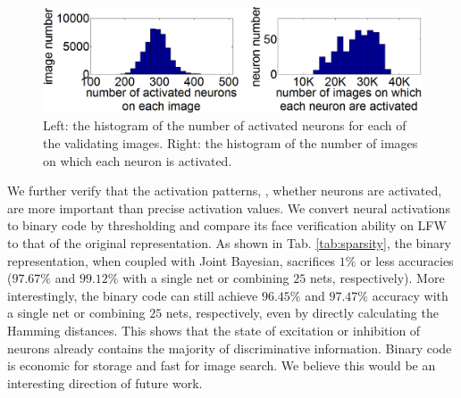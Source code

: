 \documentclass[10pt,twocolumn,letterpaper]{article}
\begin{document}
\begin{figure}[!h]
\begin{center}
\includegraphics[width = 0.9\linewidth]{picture/sparsity.png}
\end{center}
\vspace{-0.15in}
\caption{Left: the histogram of the number of activated neurons for each of the validating images. Right: the histogram of the number of images on which each neuron is activated.}
\label{fig:sparsity}
\vspace{-0.05in}
\end{figure}

We further verify that the activation patterns, \ie, whether neurons are activated, are more important than precise activation values. We convert neural activations to binary code by thresholding and compare its face verification ability on LFW to that of the original representation. As shown in Tab. \ref{tab:sparsity}, the binary representation, when coupled with Joint Bayesian, sacrifices $1\%$ or less accuracies ($97.67\%$ and $99.12\%$ with a single net or combining $25$ nets, respectively). More interestingly, the binary code can still achieve $96.45\%$ and $97.47\%$ accuracy with a single net or combining $25$ nets, respectively, even by directly calculating the Hamming distances. This shows that the state of excitation or inhibition of neurons already contains the majority of discriminative information. Binary code is economic for storage and fast for image search. We believe this would be an interesting direction of future work.
\end{document}
